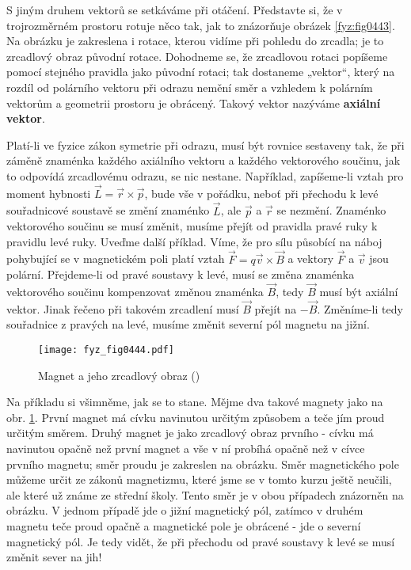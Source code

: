     S jiným druhem vektorů se setkáváme při otáčení. Představte si, že v trojrozměrném prostoru
    rotuje něco tak, jak to znázorňuje obrázek \ref{fyz:fig0443}. Na obrázku je zakreslena i rotace,
    kterou vidíme při pohledu do zrcadla; je to zrcadlový obraz původní rotace. Dohodneme se, že
    zrcadlovou rotaci popíšeme pomocí stejného pravidla jako původní rotaci; tak dostaneme „vektor“,
    který na rozdíl od polárního vektoru při odrazu nemění směr a vzhledem k polárním vektorům a
    geometrii prostoru je obrácený. Takový vektor nazýváme \textbf{axiální vektor}.

    Platí-li ve fyzice zákon symetrie při odrazu, musí být rovnice sestaveny tak, že při záměně
    znaménka každého axiálního vektoru a každého vektorového součinu, jak to odpovídá zrcadlovému
    odrazu, se nic nestane. Například, zapíšeme-li vztah pro moment hybnosti \(\vec{L} =
    \vec{r}\times \vec{p}\), bude vše v pořádku, neboť při přechodu k levé souřadnicové soustavě se
    změní znaménko \(\vec{L}\), ale \(\vec{p}\) a \(\vec{r}\) se nezmění. Znaménko vektorového
    součinu se musí změnit, musíme přejít od pravidla pravé ruky k pravidlu levé ruky. Uveďme další
    příklad. Víme, že pro sílu působící na náboj pohybující se v magnetickém poli platí vztah
    \(\vec{F} = q \vec{v}\times\vec{B}\) a vektory \(\vec{F}\) a \(\vec{v}\) jsou polární.
    Přejdeme-li od pravé soustavy k levé, musí se změna znaménka vektorového součinu kompenzovat
    změnou znaménka \(\vec{B}\), tedy \(\vec{B}\) musí být axiální vektor. Jinak řečeno při takovém
    zrcadlení musí \(\vec{B}\) přejít na \(-\vec{B}\). Změníme-li tedy souřadnice z pravých na levé,
    musíme změnit severní pól magnetu na jižní.

    \begin{figure}[ht!] %
      \centering
      \texttt{[image: fyz\_fig0444.pdf]}
      \caption{Magnet a jeho zrcadlový obraz (\cite[s.~707]{Feynman01})}
      \label{fyz:fig0444}
    \end{figure}

    Na příkladu si všimněme, jak se to stane. Mějme dva takové magnety jako na obr.
    \ref{fyz:fig0444}. První magnet má cívku navinutou určitým způsobem a teče jím proud určitým
    směrem. Druhý magnet je jako zrcadlový obraz prvního - cívku má navinutou opačně než první
    magnet a vše v ní probíhá opačně než v cívce prvního magnetu; směr proudu je zakreslen na
    obrázku. Směr magnetického pole můžeme určit ze zákonů magnetizmu, které jsme se v tomto kurzu
    ještě neučili, ale které už známe ze střední školy. Tento směr je v obou případech znázorněn na
    obrázku. V jednom případě jde o jižní magnetický pól, zatímco v druhém magnetu teče proud opačně
    a magnetické pole je obrácené - jde o severní magnetický pól. Je tedy vidět, že při přechodu od
    pravé soustavy k levé se musí změnit sever na jih!

